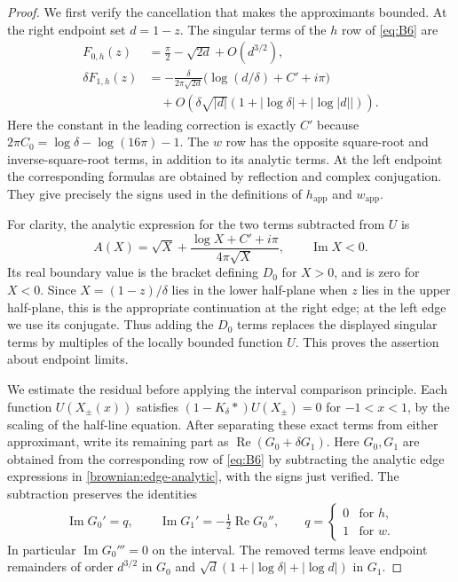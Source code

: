 \begin{proof}
We first verify the cancellation that makes the approximants bounded.
At the right endpoint set $d=1-z$.  The singular terms of the $h$
row of \eqref{eq:B6} are
\[
\begin{aligned}
 F_{0,h}(z)&=\frac\pi2-\sqrt{2d}+O(d^{3/2}),\\
 \delta F_{1,h}(z)&=
 -\frac{\delta}{2\pi\sqrt{2d}}
       \bigl(\log(d/\delta)+C'+i\pi\bigr)\\
 &\quad+O\!\left(\delta\sqrt{|d|}
       (1+|\log\delta|+|\log|d||)\right).
\end{aligned}
\]
Here the constant in the leading correction is exactly $C'$ because
$2\pi C_0=\log\delta-\log(16\pi)-1$.
The $w$ row has the opposite square-root and inverse-square-root
terms, in addition to its analytic terms.  At the left endpoint the
corresponding formulas are obtained by reflection and complex
conjugation.  They give precisely the signs used in the definitions
of $h_{\mathrm{app}}$ and $w_{\mathrm{app}}$.

For clarity, the analytic expression for the two terms subtracted
from $U$ is
\begin{equation}\label{brownian:edge-analytic}
 A(X)=\sqrt X+
       \frac{\log X+C'+i\pi}{4\pi\sqrt X},
 \qquad \operatorname{Im}X<0.
\end{equation}
Its real boundary value is the bracket defining $D_0$ for $X>0$,
and is zero for $X<0$.  Since $X=(1-z)/\delta$ lies in the lower
half-plane when $z$ lies in the upper half-plane, this is the
appropriate continuation at the right edge; at the left edge we use
its conjugate.  Thus adding the $D_0$ terms replaces the displayed
singular terms by multiples of the locally bounded function $U$.
This proves the assertion about endpoint limits.

We estimate the residual before applying the interval comparison
principle.  Each function $U(X_\pm(x))$ satisfies
$(1-K_\delta*)U(X_\pm)=0$ for $-1<x<1$, by the scaling of the
half-line equation.  After separating these exact terms from either
approximant, write its remaining part as
$\operatorname{Re}(G_0+\delta G_1)$.  Here $G_0,G_1$ are obtained
from the corresponding row of \eqref{eq:B6} by subtracting the
analytic edge expressions in \eqref{brownian:edge-analytic}, with
the signs just verified.  The subtraction preserves the identities
\[
 \operatorname{Im}G_0'=q,\qquad
 \operatorname{Im}G_1'=-\tfrac12\operatorname{Re}G_0'',
 \qquad
 q=\begin{cases}0&\text{for }h,\\1&\text{for }w.\end{cases}
\]
In particular $\operatorname{Im}G_0'''=0$ on the interval.
The removed terms leave endpoint remainders of order $d^{3/2}$
in $G_0$ and
$\sqrt d(1+|\log\delta|+|\log d|)$ in $G_1$.


\end{proof}
